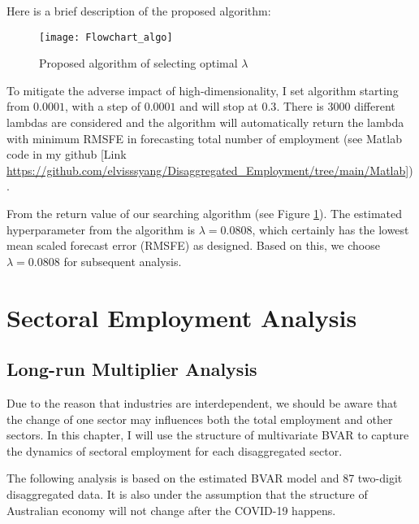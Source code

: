 \documentclass{monashthesis}
\begin{document}
Here is a brief description of the proposed algorithm:

\graphicspath{ {/Users/elvisyang/Desktop/hon_proj/Disaggregated_Employment/Honours_thesis/figures} }

\begin{figure}[ht]
\texttt{[image: Flowchart\_algo]}
\centering
\caption{Proposed algorithm of selecting optimal $\lambda$}
\label{fig:sealgo}
\end{figure}

To mitigate the adverse impact of high-dimensionality, I set algorithm starting from \(0.0001\), with a step of \(0.0001\) and will stop at \(0.3\). There is 3000 different lambdas are considered and the algorithm will automatically return the lambda with minimum RMSFE in forecasting total number of employment (see Matlab code in my github {[}Link \url{https://github.com/elvisssyang/Disaggregated_Employment/tree/main/Matlab}{]}).

From the return value of our searching algorithm (see Figure \ref{fig:sealgo}). The estimated hyperparameter from the algorithm is \(\lambda=0.0808\), which certainly has the lowest mean scaled forecast error (RMSFE) as designed. Based on this, we choose \(\lambda=0.0808\) for subsequent analysis.

\newpage

\hypertarget{sectoral-employment-analysis}{%
\chapter{Sectoral Employment Analysis}\label{sectoral-employment-analysis}}

\hypertarget{long-run-multiplier-analysis}{%
\section{Long-run Multiplier Analysis}\label{long-run-multiplier-analysis}}

Due to the reason that industries are interdependent, we should be aware that the change of one sector may influences both the total employment and other sectors. In this chapter, I will use the structure of multivariate BVAR to capture the dynamics of sectoral employment for each disaggregated sector.

The following analysis is based on the estimated BVAR model and 87 two-digit disaggregated data. It is also under the assumption that the structure of Australian economy will not change after the COVID-19 happens.
\end{document}
